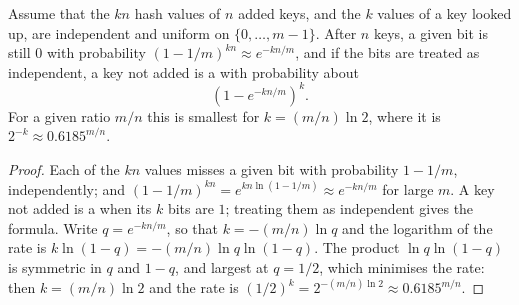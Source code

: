 \begin{omfigure}
\par{}
\end{omfigure}

\begin{proposition}\label{prop:b2:randomised-algorithms:bloom-rate}
Assume that the $kn$ hash values of $n$ added keys, and the $k$ values of a key looked up, are independent and uniform on
$\{0, \dots, m - 1\}$. After $n$ keys, a given bit is still $0$ with probability $(1 - 1/m)^{kn} \approx e^{-kn/m}$, and
if the bits are treated as independent, a key not added is a  with probability about
\[
\left(1 - e^{-kn/m}\right)^k .
\]
For a given ratio $m/n$ this is smallest for $k = (m/n) \ln 2$, where it is $2^{-k} \approx 0.6185^{m/n}$.
\end{proposition}

\begin{proof}
Each of the $kn$ values misses a given bit with probability $1 - 1/m$, independently; and $(1 - 1/m)^{kn} = e^{kn \ln(1 -
1/m)} \approx e^{-kn/m}$ for large $m$. A key not added is a  when its $k$ bits are $1$; treating them as
independent gives the formula. Write $q = e^{-kn/m}$, so that $k = -(m/n) \ln q$ and the logarithm of the rate is $k \ln(1
- q) = -(m/n) \ln q \ln(1 - q)$. The product $\ln q \ln(1 - q)$ is symmetric in $q$ and $1 - q$, and largest at $q =
1/2$, which minimises the rate: then $k = (m/n) \ln 2$ and the rate is $(1/2)^k = 2^{-(m/n)\ln 2} \approx 0.6185^{m/n}$.
\end{proof}

